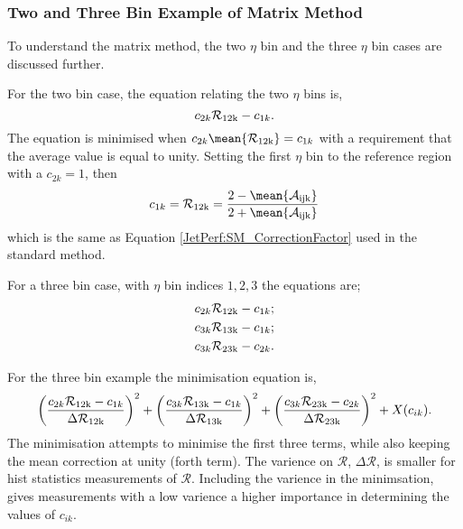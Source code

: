 \subsubsection{Two and Three Bin Example of Matrix Method}
To understand the matrix method, the two $\eta$ bin and the three $\eta$ bin cases are discussed further.


For the two bin case, the equation relating the two $\eta$ bins is,  
\begin{equation}
c_{2k}\mathcal{R_{\rm 12k}}- c_{1k}.
\label{JetPerf:Matrix_2binEquations}
\end{equation}
The equation is minimised when $c_{2k}\mean{\mathcal{R_{\rm 12k}}}= c_{1k}$ with a requirement that the average value is equal to unity.
Setting the first $\eta$ bin to the reference region with a $c_{2k}=1$, then 
\begin{equation}
c_{1k}=\mathcal{R_{\rm 12k}}= \frac{2-\mean{\mathcal{A_{\rm ijk}}}}{2+\mean{\mathcal{A_{\rm ijk}}}} 
\label{JetPerf:Matrix_2binEquations}
\end{equation}
which is the same as Equation \ref{JetPerf:SM_CorrectionFactor} used in the standard method.


For a three bin case, with $\eta$ bin indices ${1,2,3}$ the equations are;
\begin{equation}
\begin{split}
c_{2k}\mathcal{R_{\rm 12k}}- c_{1k}; \\
c_{3k}\mathcal{R_{\rm 13k}}- c_{1k}; \\
c_{3k}\mathcal{R_{\rm 23k}}- c_{2k}.
\end{split}
\label{JetPerf:Matrix_3binEquations}
\end{equation}

For the three bin example the minimisation equation is,
\begin{equation}
\left(\frac{c_{2k}\mathcal{R_{\rm 12k}}- c_{1k}}{\Delta\mathcal{R_{\rm 12k}}}\right)^2+
\left(\frac{c_{3k}\mathcal{R_{\rm 13k}}- c_{1k}}{\Delta\mathcal{R_{\rm 13k}}}\right)^2+
\left(\frac{c_{3k}\mathcal{R_{\rm 23k}}- c_{2k}}{\Delta\mathcal{R_{\rm 23k}}}\right)^2+ X(c_{ik}).
\label{JetPerf:Matrix_3binEquations2}
\end{equation}
The minimisation attempts to minimise the first three terms, while also keeping the mean correction at unity (forth term).
The varience on $\mathcal{R}$, $\Delta\mathcal{R}$, is smaller for hist statistics measurements of $\mathcal{R}$.
Including the varience in the minimsation, gives measurements with a low varience a higher importance in determining the values of $c_{ik}$. 

